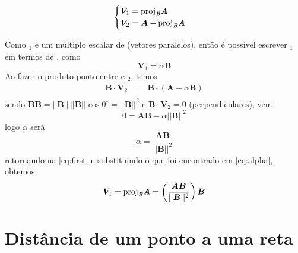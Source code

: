 \documentclass[a4paper, 12pt, brazilian]{article}
\newcommand{\bfit}[1]{\textit{\textbf{#1}}}
\newcommand{\proj}[2]{\textrm{proj}_{\bfit{#1}}\bfit{#2}}
\begin{document}
	$$
	\begin{cases}
		\bm{V}_{1}=\proj{B}{A}\\
		\bm{V}_{2}=\bm{A}-\proj{B}{A}
	\end{cases}
	$$
	
	Como $_{1}$ é um múltiplo escalar de  (vetores paralelos), então é possível escrever $_{1}$ em termos de , como
	\begin{equation}
		\label{eq:first}
		\bm{V}_{1}=\alpha\bm{B}
	\end{equation}
	Ao fazer o produto ponto entre  e $_{2}$, temos
	\begin{eqnarray}
		\bm{B}\cdot\bm{V}_{2}&=&\bm{B}\cdot(\bm{A}-\alpha\bm{B})\\
	\end{eqnarray}
	sendo $\bm{B}\bm{B}=||\bm{B}||\,||\bm{B}||\cos 0^{\circ}=||\bm{B}||^{2}$ e $\bm{B}\cdot\bm{V}_{2}=0$ (perpendiculares), vem
	\begin{equation}
		0=\bm{A}\bm{B}-\alpha ||\bm{B}||^{2}
	\end{equation}
	logo $\alpha$ será
	\begin{equation}
		\label{eq:alpha}
		\alpha=\dfrac{\bm{A}\bm{B}}{||\bm{B}||^{2}}
	\end{equation}
	retornando na \cref{eq:first} e substituindo o que foi encontrado em \cref{eq:alpha}, obtemos
	\begin{equation}
		\bm{V}_{1}=\proj{B}{A}=\left(\dfrac{\bm{A}\bm{B}}{||\bm{B}||^{2}}\right)\bm{B}
	\end{equation}
	
	\section{Distância de um ponto a uma reta}
	
\end{document}
